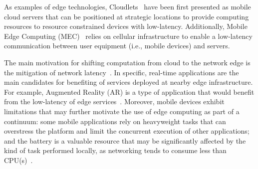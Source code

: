 As examples of edge technologies, Cloudlets~\cite{Satyanarayanan:2009} have been first presented as mobile cloud servers that can be positioned at strategic locations to provide computing resources to resource constrained devices with low-latency. 
Additionally, Mobile Edge Computing (MEC)~\cite{ahmed2016isco} relies on cellular infrastructure to enable a low-latency communication between user equipment (i.e., mobile devices) and servers. 

The main motivation for shifting computation from cloud to the network edge is the mitigation of network latency~\cite{Bonomi2014}. In specific, real-time applications are the main candidates for benefiting of services deployed at nearby edge infrastructure. For example, Augmented Reality (AR) is a type of application that would benefit from the low-latency of edge services~\cite{hu2015mobile,GarrigaMendonca2017}. Moreover, mobile devices exhibit limitations that may further motivate the use of edge computing as part of a continuum: some mobile applications rely on heavyweight tasks that can overstress the platform and limit the concurrent execution of other applications; and the battery is a valuable resource that may be significantly affected by the kind of task performed locally, as networking tends to consume less than CPU(s)~\cite{Carroll:2010}. 

